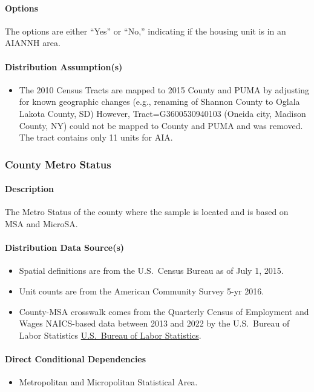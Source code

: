 \paragraph{Options}
The options are either ``Yes'' or ``No,'' indicating if the housing unit is in an AIANNH area.

\paragraph{Distribution Assumption(s)}
\begin{itemize}
    \item The 2010 Census Tracts are mapped to 2015 County and PUMA by adjusting for known geographic changes (e.g., renaming of Shannon County to Oglala Lakota County, SD) However, Tract=G3600530940103 (Oneida city, Madison County, NY) could not be mapped to County and PUMA and was removed. The tract contains only 11 units for AIA.
\end{itemize}

\subsubsection{County Metro Status}
\paragraph{Description}
The Metro Status of the county where the sample is located and is based on MSA and MicroSA.

\paragraph{Distribution Data Source(s)}
\begin{itemize}
    \item Spatial definitions are from the U.S.~Census Bureau as of July 1, 2015.
    \item Unit counts are from the American Community Survey 5-yr 2016.
    \item County-MSA crosswalk comes from the Quarterly Census of Employment and Wages NAICS-based data between 2013 and 2022 by the U.S.~Bureau of Labor Statistics \href{https://www.bls.gov/cew/classifications/areas/county-msa-csa-crosswalk.htm}{U.S.~Bureau of Labor Statistics}.
\end{itemize}

\paragraph{Direct Conditional Dependencies}
\begin{itemize}
    \item Metropolitan and Micropolitan Statistical Area.
\end{itemize}

